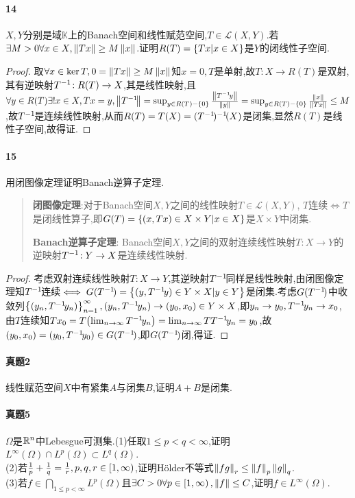 \documentclass{article}
\begin{document}
\paragraph{14}$X,Y$分别是域$\mathbb{K}$上的Banach空间和线性赋范空间,$T\in \mathcal{L}(X,Y)$.若$\exists M>0\forall x\in X, \left\|Tx\right\|\geq M\left\|x\right\|$.证明$R(T)=\left\{Tx|x\in X\right\}$是$Y$的闭线性子空间.
\begin{proof}
    取$\forall x\in \ker T, 0=\left\|Tx\right\|\geq M\left\|x\right\|$知$x=0, T$是单射,故$T:X\to R(T)$是双射,其有逆映射$T^{-1}\!:R(T)\to X$,其是线性映射,且$\forall y\in R(T)\exists! x\in X, Tx=y, \left\|T^{-1}\!\right\|=\sup_{y\in R(T)-\left\{0\right\}}\frac{\left\|T^{-1}\! y\right\|}{\left\|y\right\|}=\sup_{y\in R(T)-\left\{0\right\}}\frac{\left\|x\right\|}{\left\|Tx\right\|}\leq M$,故$T^{-1}\!$是连续线性映射,从而$R(T)=T(X)=(T^{-1}\!)^{-1}\!(X)$是闭集,显然$R(T)$是线性子空间,故得证.
\end{proof}

\paragraph{15}用闭图像定理证明Banach逆算子定理.
\begin{quotation}
    \textbf{闭图像定理}:对于Banach空间$X,Y$之间的线性映射$T\in\mathcal{L}(X,Y)$, $T$连续$\iff T$是闭线性算子,即$G(T)=\left\{(x,Tx)\in X\times Y|x\in X\right\}$是$X\times Y$中闭集.

    \textbf{Banach逆算子定理}: Banach空间$X,Y$之间的双射连续线性映射$T:X\to Y$的逆映射$T^{-1}\!:Y\to X$是连续线性映射.
\end{quotation}

\begin{proof}
    考虑双射连续线性映射$T:X\to Y$,其逆映射$T^{-1}\!$同样是线性映射,由闭图像定理知$T^{-1}\!$连续$\iff G(T^{-1}\!)=\left\{(y,T^{-1}\! y)\in Y\times X|y\in Y\right\}$是闭集.考虑$G(T^{-1}\!)$中收敛列$\left\{(y_n,T^{-1}\! y_n)\right\}_{n=1}^\infty, (y_n,T^{-1}\! y_n)\to (y_0,x_0)\in Y\times X$,即$y_n\to y_0, T^{-1}\! y_n\to x_0$,由$T$连续知$Tx_0=T\!\left(\lim_{n\to\infty}T^{-1}\! y_n\right)=\lim_{n\to\infty}TT^{-1}\! y_n=y_0$,故$(y_0,x_0)=(y_0,T^{-1}\! y_0)\in G(T^{-1}\!)$,即$G(T^{-1}\!)$闭,得证.
\end{proof}

\paragraph{真题2}线性赋范空间$X$中有紧集$A$与闭集$B$,证明$A+B$是闭集.

\paragraph{真题5}$\Omega$是$\mathbb{R}^n$中Lebesgue可测集.(1)任取$1\leq p<q<\infty$,证明$L^\infty(\Omega)\cap L^p(\Omega)\subset L^q(\Omega)$.\\
(2)若$\frac{1}{p}+\frac{1}{q}=\frac{1}{r}, p,q,r\in \left[1,\infty\right)$,证明H\"older不等式$\left\|fg\right\|_r\leq\left\|f\right\|_p\left\|g\right\|_q$.\\
(3)若$f\in \bigcap_{1\leq p<\infty}L^p(\Omega)$且$\exists C>0\forall p\in \left[1,\infty\right), \left\|f\right\|\leq C$,证明$f\in L^\infty(\Omega)$.
\end{document}
